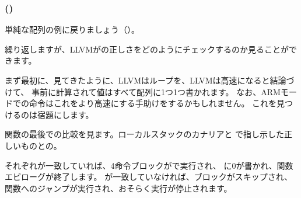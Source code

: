 ﻿\subsubsection{\OptimizingXcodeIV (\ThumbTwoMode)}

単純な配列の例に戻りましょう（）。

繰り返しますが、LLVMがの正しさをどのようにチェックするのか見ることができます。




まず最初に、見てきたように、LLVMはループを、LLVMは高速になると結論づけて、
事前に計算されて値はすべて配列に1つ1つ書かれます。
なお、ARMモードでの命令はこれをより高速にする手助けをするかもしれません。
これを見つけるのは宿題にします。

関数の最後での比較を見ます。ローカルスタックのカナリアと で指し示した正しいものとの。


それぞれが一致していれば、4命令ブロックがで実行され、
に0が書かれ、関数エピローグが終了します。
が一致していなければ、ブロックがスキップされ、
関数へのジャンプが実行され、おそらく実行が停止されます。
